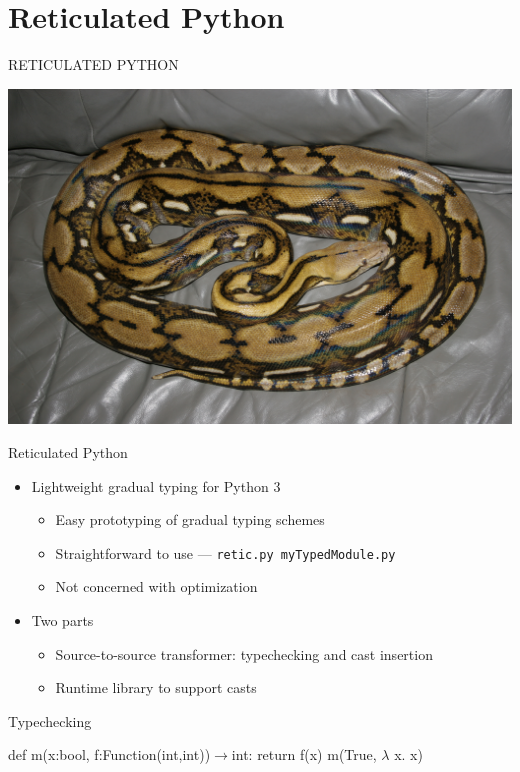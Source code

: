 \documentclass[mathserif]{beamer}
\begin{document}
\section{Reticulated Python}
\begin{frame}{RETICULATED PYTHON}
  \begin{center}
    \includegraphics[scale=.08]{Reticulated_python_MP1.JPG}  
  \end{center}
\end{frame}

\begin{frame}{Reticulated Python}
  \begin{itemize}
  \item Lightweight gradual typing for Python 3
    \begin{itemize}
    \item Easy prototyping of gradual typing schemes
    \item Straightforward to use --- \texttt{retic.py myTypedModule.py}
    \item Not concerned with optimization
    \end{itemize}
  \item Two parts
    \begin{itemize}
    \item Source-to-source transformer: typechecking and cast insertion
    \item Runtime library to support casts
    \end{itemize}
  \end{itemize}
\end{frame}

\begin{frame}{Typechecking}
 \begin{algorithmic}[2]
    \State def m(x:bool, f:Function(int,int))$\to$int:
    \State \;\;\;return f(x)
    \State 
    \State m(True, $\lambda$ x. x)
  \end{algorithmic}
\end{frame}
\end{document}
